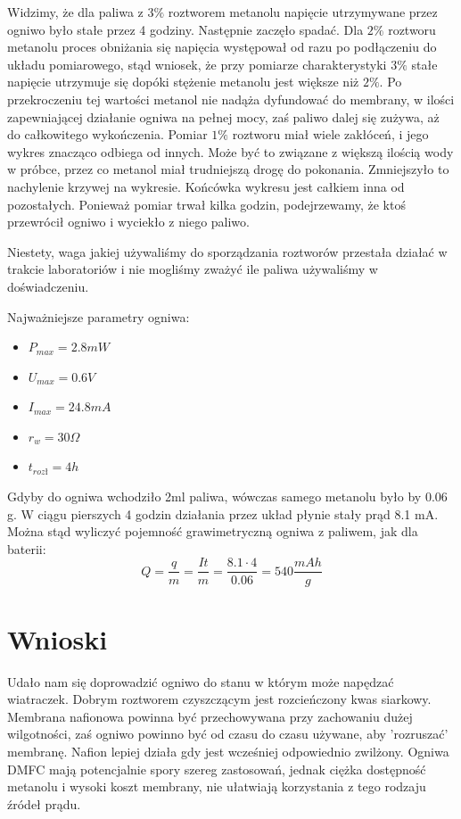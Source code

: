 \documentclass[a4paper,12pt]{article}
\begin{document}
Widzimy, że dla paliwa z $3\%$ roztworem metanolu napięcie utrzymywane przez ogniwo było stałe przez 4 godziny. Następnie zaczęło spadać. Dla $2\%$ roztworu metanolu proces obniżania się napięcia występował od razu po podłączeniu do układu pomiarowego, stąd wniosek, że przy pomiarze charakterystyki $3\%$ stałe napięcie utrzymuje się dopóki stężenie metanolu jest większe niż $2\%$. Po przekroczeniu tej wartości metanol nie nadąża dyfundować do membrany, w ilości zapewniającej działanie ogniwa na pełnej mocy, zaś paliwo dalej się zużywa, aż do całkowitego wykończenia. Pomiar $1\%$ roztworu miał wiele zakłóceń, i jego wykres znacząco odbiega od innych. Może być to związane z większą ilością wody w próbce, przez co metanol miał trudniejszą drogę do pokonania. Zmniejszyło to nachylenie krzywej na wykresie. Końcówka wykresu jest całkiem inna od pozostałych. Ponieważ pomiar trwał  kilka godzin, podejrzewamy, że ktoś przewrócił ogniwo i wyciekło z niego paliwo.

Niestety, waga jakiej używaliśmy do sporządzania roztworów przestała działać w trakcie laboratoriów i nie mogliśmy zważyć ile paliwa używaliśmy w doświadczeniu. 

Najważniejsze parametry ogniwa:
\begin{itemize}
  \item $ P_{max}= 2.8 mW $
  \item $U_{max}= 0.6 V $
  \item $I_{max}= 24.8 mA$
  \item $r_{w}= 30 \Omega$
  \item $t_{rozł}= 4 h $
\end{itemize}
Gdyby do ogniwa wchodziło 2ml paliwa, wówczas samego metanolu było by 0.06 g. W ciągu pierszych 4 godzin działania przez układ płynie stały prąd 8.1 mA. Można stąd wyliczyć pojemność grawimetryczną ogniwa z paliwem, jak dla baterii:
$$ Q = \frac{q}{m} =\frac{It}{m}= \frac{8.1 \cdot 4}{0.06}= 540 \frac{mAh}{g} $$



\section{Wnioski}
Udało nam się doprowadzić ogniwo do stanu w którym może napędzać wiatraczek. Dobrym roztworem czyszczącym jest rozcieńczony kwas siarkowy. Membrana nafionowa powinna być przechowywana przy zachowaniu dużej wilgotności, zaś ogniwo powinno być od czasu do czasu używane, aby 'rozruszać' membranę. Nafion lepiej działa gdy jest wcześniej odpowiednio zwilżony. Ogniwa DMFC mają potencjalnie spory szereg zastosowań, jednak ciężka dostępność metanolu i wysoki koszt membrany, nie ułatwiają korzystania z tego rodzaju źródeł prądu. 
\end{document}
